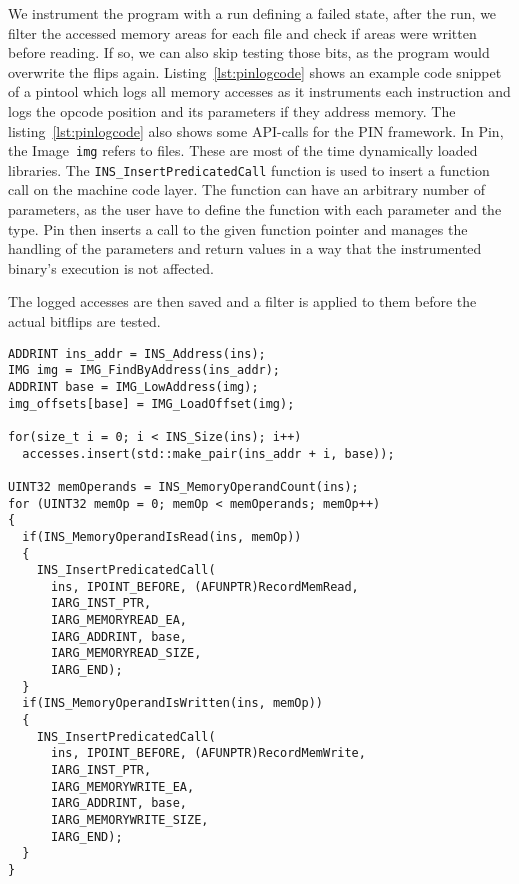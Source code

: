 We instrument the program with a run defining a failed state, after the run, we
filter the accessed memory areas for each file and check if areas were written
before reading. If so, we can also skip testing those bits, as the program would
overwrite the flips again. Listing~\ref{lst:pinlogcode} shows an example code
snippet of a pintool which logs all memory accesses as it instruments each
instruction and logs the opcode position and its parameters if they address
memory. The listing~\ref{lst:pinlogcode} also shows some API-calls for the PIN
framework. In Pin, the Image~\texttt{img} refers to files. These are most of the
time dynamically loaded libraries. The \texttt{INS\_InsertPredicatedCall}
function is used to insert a function call on the machine code layer. The
function can have an arbitrary number of parameters, as the user have to define
the function with each parameter and the type. Pin then inserts a call to the
given function pointer and manages the handling of the parameters and return
values in a way that the instrumented binary's execution is not affected.

The logged accesses are then saved and a filter is applied to them before the
actual bitflips are tested.

\begin{minipage}{\linewidth}
\begin{lstlisting}[style=CStyle,
                   caption={Example C++ code for a pintool logging memory
accesses. At first, the tool stores the instruction bytes, and after the
operands are stored separately, depending on if they are writing or reading
memory.},
                   label={lst:pinlogcode}]
ADDRINT ins_addr = INS_Address(ins);
IMG img = IMG_FindByAddress(ins_addr);
ADDRINT base = IMG_LowAddress(img);
img_offsets[base] = IMG_LoadOffset(img);

for(size_t i = 0; i < INS_Size(ins); i++)
  accesses.insert(std::make_pair(ins_addr + i, base));

UINT32 memOperands = INS_MemoryOperandCount(ins);
for (UINT32 memOp = 0; memOp < memOperands; memOp++)
{
  if(INS_MemoryOperandIsRead(ins, memOp))
  {
    INS_InsertPredicatedCall(
      ins, IPOINT_BEFORE, (AFUNPTR)RecordMemRead,
      IARG_INST_PTR,
      IARG_MEMORYREAD_EA,
      IARG_ADDRINT, base,
      IARG_MEMORYREAD_SIZE,
      IARG_END);
  }
  if(INS_MemoryOperandIsWritten(ins, memOp))
  {
    INS_InsertPredicatedCall(
      ins, IPOINT_BEFORE, (AFUNPTR)RecordMemWrite,
      IARG_INST_PTR,
      IARG_MEMORYWRITE_EA,
      IARG_ADDRINT, base,
      IARG_MEMORYWRITE_SIZE,
      IARG_END);
  }
}
\end{lstlisting}
\end{minipage}

